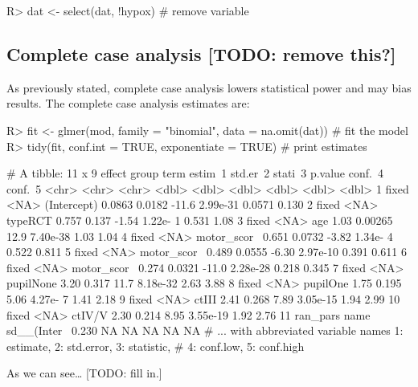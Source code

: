 \documentclass[
]{jss}
\begin{document}
\begin{CodeChunk}
\begin{CodeInput}
R> dat <- select(dat, !hypox)  # remove variable
\end{CodeInput}
\end{CodeChunk}

\hypertarget{complete-case-analysis-todo-remove-this}{%
\subsection{Complete case analysis {[}TODO: remove
this?{]}}\label{complete-case-analysis-todo-remove-this}}

As previously stated, complete case analysis lowers statistical power
and may bias results. The complete case analysis estimates are:

\begin{CodeChunk}
\begin{CodeInput}
R> fit <- glmer(mod, family = "binomial", data = na.omit(dat)) # fit the model
R> tidy(fit, conf.int = TRUE, exponentiate = TRUE)             # print estimates
\end{CodeInput}
\begin{CodeOutput}
# A tibble: 11 x 9
   effect   group term        estim~1 std.er~2 stati~3   p.value conf.~4 conf.~5
   <chr>    <chr> <chr>         <dbl>    <dbl>   <dbl>     <dbl>   <dbl>   <dbl>
 1 fixed    <NA>  (Intercept)  0.0863  0.0182   -11.6   2.99e-31  0.0571   0.130
 2 fixed    <NA>  typeRCT      0.757   0.137     -1.54  1.22e- 1  0.531    1.08 
 3 fixed    <NA>  age          1.03    0.00265   12.9   7.40e-38  1.03     1.04 
 4 fixed    <NA>  motor_scor~  0.651   0.0732    -3.82  1.34e- 4  0.522    0.811
 5 fixed    <NA>  motor_scor~  0.489   0.0555    -6.30  2.97e-10  0.391    0.611
 6 fixed    <NA>  motor_scor~  0.274   0.0321   -11.0   2.28e-28  0.218    0.345
 7 fixed    <NA>  pupilNone    3.20    0.317     11.7   8.18e-32  2.63     3.88 
 8 fixed    <NA>  pupilOne     1.75    0.195      5.06  4.27e- 7  1.41     2.18 
 9 fixed    <NA>  ctIII        2.41    0.268      7.89  3.05e-15  1.94     2.99 
10 fixed    <NA>  ctIV/V       2.30    0.214      8.95  3.55e-19  1.92     2.76 
11 ran_pars name  sd__(Inter~  0.230  NA         NA    NA        NA       NA    
# ... with abbreviated variable names 1: estimate, 2: std.error, 3: statistic,
#   4: conf.low, 5: conf.high
\end{CodeOutput}
\end{CodeChunk}

As we can see\ldots{} {[}TODO: fill in.{]}
\end{document}
